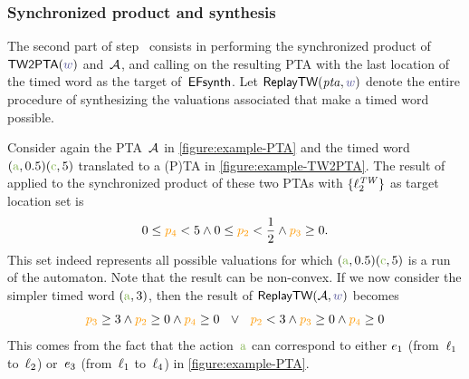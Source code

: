 \begin{tikzborder}{\cite{Gargantini16:validation}}
\begin{tikzborder}{\cite{gargantini_combinatorial_2017}}
\begin{tikzborder}{\cite{gargantini_combinatorial_2017}}
\begin{tikzborder}{\cite{garn2019}}
\begin{tikzborder}{\cite{arcaini2019achieving}}
\begin{tikzborder}{\cite{arcaini2019varivolution}}
\begin{minipage}{0.47\textwidth}
	\label{figure:example-TW2PTA}
\end{minipage}

\subsubsection{Synchronized product and synthesis}
\begin{tikzborder}{}
The second part of step~ consists in performing the synchronized product of $\TransWord(\word)$ and~$\mathcal{A}$, and calling \EFsynth{} on the resulting PTA with the last location of the timed word as the target of~$\textsf{EFsynth}$.
%
Let $\replayTW(\ptaProc, \word)$ denote the entire procedure of synthesizing the valuations associated that make a timed word possible.

\begin{example}
	Consider again the PTA~$\mathcal{A}$ in \ref{figure:example-PTA} and the timed word $(\styleact{a}, 0.5) (\styleact{c}, 5)$ translated to a (P)TA in \ref{figure:example-TW2PTA}.
	The result of \EFsynth{} applied to the synchronized product of these two PTAs with $\{\ell^\mathit{TW}_2\}$ as target location set is
	\[0 \leq \parami{4} < 5 \land 0 \leq \parami{2} < \frac{1}{2} \land \parami{3} \geq 0\text{.}\]
	This set indeed represents all possible valuations for which $(\styleact{a}, 0.5) (\styleact{c}, 5)$ is a run of the automaton.
	Note that the result can be non-convex.
	If we now consider the simpler timed word $(\styleact{a}, 3)$, then the result of $\replayTW(\A, \word)$ becomes
	\[ \parami{3} \geq 3 \land \parami{2} \geq 0 \land \parami{4} \geq 0 \ \ \lor \ \ \parami{2} < 3 \land \parami{3} \geq 0 \land \parami{4} \geq 0 \]
	This comes from the fact that the action~$\styleact{a}$ can correspond to either $e_1$ (from~$\ell_1$ to~$\ell_2$) or~$e_3$ (from~$\ell_1$ to~$\ell_4$) in \ref{figure:example-PTA}.
\end{example}


\end{tikzborder}
\end{tikzborder}
\end{tikzborder}
\end{tikzborder}
\end{tikzborder}
\end{tikzborder}
\end{tikzborder}
